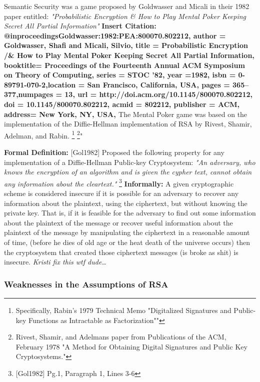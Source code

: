 Semantic Security was a game proposed by Goldwasser and Micali in their 1982 paper entitled: \textit{"Probabilistic Encryption & How to Play Mental Poker Keeping Secret All Partial Information"} 
\newline
\textbf{Insert Citation: @inproceedings{Goldwasser:1982:PEA:800070.802212, author = {Goldwasser,
Shafi and Micali, Silvio}, title = {Probabilistic Encryption /& How to Play Mental Poker Keeping Secret All Partial Information}, booktitle= {Proceedings of the Fourteenth Annual ACM Symposium on Theory of Computing}, series = {STOC '82}, year ={1982}, isbn = {0-89791-070-2},location = {San Francisco, California, USA}, pages = {365--377},numpages = {13}, url = {http://doi.acm.org/10.1145/800070.802212}, doi
= {10.1145/800070.802212}, acmid = {802212}, publisher = {ACM}, address= {New York, NY, USA}, }} 
\newline
The Mental Poker game was based on the implementation of the Diffie-Hellman implementation of RSA by Rivest, Shamir, Adelman, and Rabin.
\footnote{Specifically, Rabin's 1979 Technical Memo "Digitalized
Signatures and Public-key Functions as Intractable as Factorization""}
\footnote{Rivest, Shamir, and Adelmans paper from Publications of
the ACM, February 1978 "A Method for Obtaining Digital Signatures and
Public Key Cryptosystems."}" 

\textbf{Formal Definition:}
[Gol1982] Proposed the following property for any implementation of a Diffie-Hellman
Public-key Cryptosystem: 
\textit{"An adversary, who knows the encryption of an algorithm and is given the cypher text, cannot obtain any information about the cleartext."} \footnote{[Gol1982] Pg.1, Paragraph 1, Lines 3-6} 
\textbf{Informally:}
A given cryptographic scheme is considered insecure if it is possible for an adversary to recover any information about the plaintext, using the ciphertext, but without knowing the private key. That is, if it is feasible for the adversary to find out some information about the plaintext of the message or recover useful information about the plaintext of the message by manipulating the ciphertext in a reasonable
amount of time, (before he dies of old age or the heat death of the
universe occurs) then the cryptosystem that created those ciphertext
messages (is broke as shit) is insecure. \textit{Kristi fix this wtf dude…}

\subsubsection{Weaknesses in the Assumptions of RSA} 

